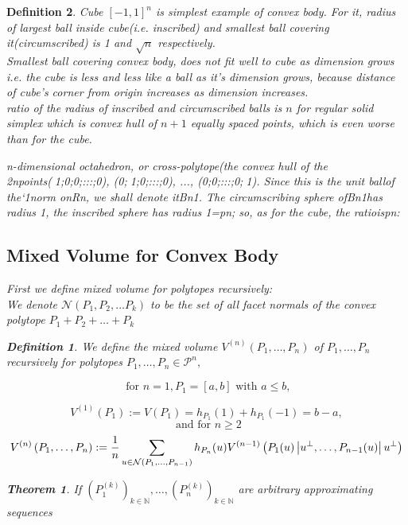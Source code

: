 \documentclass[oneside]{book}
\newtheorem{theorem}{Theorem}[section]
\newtheorem{mydef}{Definition}
\begin{document}
\begin{mydef}
 
Cube $[-1,1]^{n}$ is simplest example of convex body. For it, radius of largest ball inside cube(i.e. inscribed) and smallest ball covering it(circumscribed) is 1 and $\sqrt{n} $ respectively.
\\
 Smallest  ball covering convex body, does not fit well to cube as dimension grows i.e. the cube is less and less like a ball as it's dimension grows, because distance of cube's corner from origin increases as dimension increases.\\   
ratio of the radius of inscribed and circumscribed balls is $ n $ for regular solid simplex which is convex hull of $ n + 1$  equally spaced points,  which is even worse than for the cube.


n-dimensional octahedron, or cross-polytope(the convex hull of the 2npoints(1;0;0;:::;0), (0;1;0;:::;0), ..., (0;0;:::;0;1). Since this is the unit ballof the`1norm onRn, we shall denote itBn1.  The circumscribing sphere ofBn1has radius 1, the inscribed sphere has radius 1=pn; so, as for the cube, the ratioispn:


\subsection{Mixed Volume for Convex Body}
\label{ss:20}
First we define mixed volume for polytopes recursively:  \\
We denote  $ \mathcal{N}(P_{1},P_{2},\ldots P_{k})$ to be the set of all facet normals of the convex polytope $P_{1}+P_{2}+ \ldots + P_{k}$
\begin{mydef} \label{d:18}
We define the mixed volume $V^{(n)}\left(P_{1}, \ldots, P_{n}\right)$ of $P_{1}, \ldots, P_{n}$ recursively for polytopes $P_{1}, \ldots, P_{n} \in \mathcal{P}^{n},$ 
 
$$ \text{ for } n = 1, P_{1}=[a, b] \text { with } a \leq b,$$ 
    
  \begin{equation}
  \label{eq49}
      V^{(1)}\left(P_{1}\right):=V\left(P_{1}\right)=h_{P_{1}}(1)+h_{P_{1}}(-1) = b - a,  
  \end{equation} 
$$\text{ and} \text { for } n \geq 2 $$ 
\begin{equation} \label{eq50}
\\
V^{(n)}\left(P_{1}, \ldots, P_{n}\right):=\frac{1}{n} \sum_{u \in \mathcal{N}\left(P_{1}, \ldots, P_{n-1}\right)} h_{P_{n}}(u) V^{(n-1)}\left(P_{1}(u)\left|u^{\perp}, \ldots, P_{n-1}(u)\right| u^{\perp}\right)
\end{equation}
  \end{mydef}     
 \begin{theorem}
 \label{t:10}
  If $\left(P_{1}^{(k)}\right)_{k \in \mathbb{N}}, \ldots,\left(P_{n}^{(k)}\right)_{k \in \mathbb{N}}$ are arbitrary approximating sequences\\
  

\end{theorem}
\end{mydef}
\end{document}
